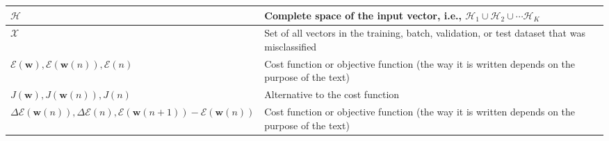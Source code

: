 \begin{xltabular}{\textwidth}{XX}
	\(\mathscr{H}\)                                                                                                                                                                & Complete space of the input vector, i.e., \(\mathscr{H}_1 \cup \mathscr{H}_2 \cup \cdots \mathscr{H}_K \)                                                                                                                                                                                                                              \\ \hline
	\(\mathscr{X}\) \cite{haykinNeuralNetworksLearning2009}                                                                                                                        & Set of all vectors in the training, batch, validation, or test dataset that was misclassified                                                                                                                                                                                                                                          \\ \hline
	\(\mathscr{E}(\mathbf{w}), \mathscr{E}(\mathbf{w}(n)), \mathscr{E}(n)\)                                                                                                        & Cost function or objective function (the way it is written depends on the purpose of the text)                                                                                                                                                                                                                                         \\ \hline
	\(J(\mathbf{w}), J(\mathbf{w}(n)), J(n)\)                                                                                                                                      & Alternative to the cost function                                                                                                                                                                                                                                                                                                       \\ \hline
	\(\Delta\mathscr{E}(\mathbf{w}(n)), \Delta\mathscr{E}(n), \mathscr{E}(\mathbf{w}(n+1)) - \mathscr{E}(\mathbf{w}(n))\)                                                          & Cost function or objective function (the way it is written depends on the purpose of the text)                                                                                                                                                                                                                                         \\ \hline

\end{xltabular}
